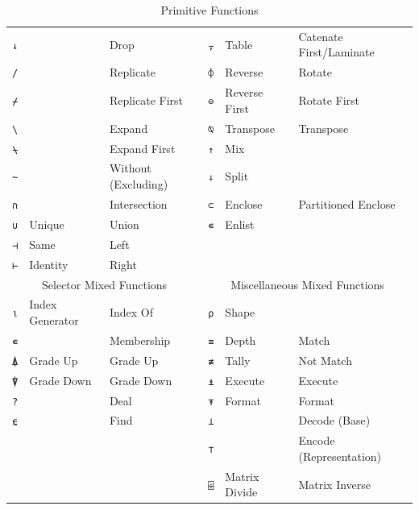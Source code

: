﻿\documentclass[numbers,10pt,preprint]{sigplanconf}
\begin{document}
\begin{table}
\begin{tabular}{cllcll}
\texttt{↓}               &          & Drop &
\texttt{⍪} & Table         & Catenate First/Laminate \\
\texttt{/}               &          & Replicate &
\texttt{⌽} & Reverse       & Rotate \\
\texttt{⌿}               &          & Replicate First &
\texttt{⊖} & Reverse First & Rotate First \\
\texttt{\textbackslash}  &          & Expand &
\texttt{⍉} & Transpose     & Transpose \\
\texttt{⍀}               &          & Expand First &
\texttt{↑} & Mix           & \\
\texttt{\textasciitilde} &          & Without (Excluding) &
\texttt{↓} & Split         & \\
\texttt{∩}               &          & Intersection &
\texttt{⊂} & Enclose       & Partitioned Enclose \\
\texttt{∪}               & Unique   & Union &
\texttt{∊} & Enlist        & \\
\texttt{⊣}               & Same     & Left \\
\texttt{⊢}               & Identity & Right\\
\midrule
\multicolumn{3}{c}{Selector Mixed Functions} &
\multicolumn{3}{c}{Miscellaneous Mixed Functions} \\
\cmidrule(r){1-3} \cmidrule(l){4-6}
\texttt{⍳} & Index Generator & Index Of &
\texttt{⍴} & Shape         & \\
\texttt{∊} &                 & Membership &
\texttt{≡} & Depth         & Match \\
\texttt{⍋} & Grade Up        & Grade Up &
\texttt{≢} & Tally         & Not Match \\
\texttt{⍒} & Grade Down      & Grade Down &
\texttt{⍎} & Execute       & Execute \\
\texttt{?} &                 & Deal &
\texttt{⍕} & Format        & Format \\
\texttt{⍷} &                 & Find &
\texttt{⊥} &               & Decode (Base) \\
& & & \texttt{⊤} &               & Encode (Representation) \\
& & & \texttt{⌹} & Matrix Divide & Matrix Inverse \\
\end{tabular}
\caption{Primitive Functions}
\label{tab:scalarprims}
\end{table}
\end{document}
